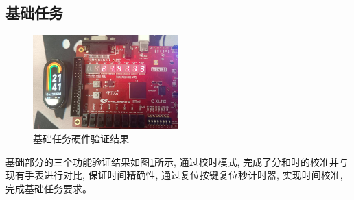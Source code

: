 \documentclass{article}
\begin{document}
\subsection*{基础任务}
\begin{figure}[H]
    \centering
    \includegraphics[width=0.5\textwidth]{image/2024-06-24-21-42-35.png}
    \caption{基础任务硬件验证结果}
    \label{image_verify_1}
\end{figure}
基础部分的三个功能验证结果如图\ref{image_verify_1}所示, 通过校时模式, 完成了分和时的校准并与现有手表进行对比, 
保证时间精确性, 通过复位按键复位秒计时器, 实现时间校准, 完成基础任务要求。\\
\end{document}
